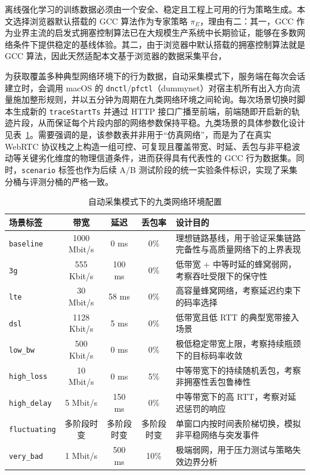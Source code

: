 离线强化学习的训练数据必须由一个安全、稳定且工程上可用的行为策略生成。本文选择浏览器默认搭载的 GCC 算法作为专家策略 $\pi_E$，理由有二：其一，GCC 作为业界主流的启发式拥塞控制算法已在大规模生产系统中长期验证，能够在多数网络条件下提供稳定的基线体验。其二，由于浏览器中默认搭载的拥塞控制算法就是 GCC 算法，因此天然适配本文基于浏览器的数据采集平台，

为获取覆盖多种典型网络环境下的行为数据，自动采集模式下，服务端在每次会话建立时，会调用 macOS 的 \texttt{dnctl}/\texttt{pfctl}（dummynet）对宿主机所有出入方向流量施加整形规则，并以五分钟为周期在九类网络环境之间轮询。每次场景切换时脚本生成新的 \texttt{traceStartTs} 并通过 HTTP 接口广播至前端，前端随即开启新的轨迹片段，从而保证每个片段内部的网络参数保持平稳。九类场景的具体参数化设计见表~\ref{tab:network-profiles-9}。需要强调的是，该参数表并非用于“仿真网络”，而是为了在真实 WebRTC 协议栈之上构造一组可控、可复现且覆盖带宽、时延、丢包与非平稳波动等关键劣化维度的物理信道条件，进而获得具有代表性的 GCC 行为数据集。同时，\texttt{scenario} 标签也作为后续 A/B 测试阶段的统一实验条件标识，实现了采集分桶与评测分桶的严格一致。

\begin{table}[htbp]
\centering
\small
\begin{tabular}{|l|c|c|c|p{5.8cm}|}
\hline
场景标签 & 带宽 & 延迟 & 丢包率 & 设计目的 \\
\hline
\texttt{baseline} & 1000 Mbit/s & 0 ms & 0\% & 理想链路基线，用于验证采集链路完备性与高质量网络下的上界表现 \\
\hline
\texttt{3g} & 555 Kbit/s & 100 ms & 0\% & 低带宽 + 中等时延的蜂窝弱网，考察吞吐受限下的保守性 \\
\hline
\texttt{lte} & 30 Mbit/s & 58 ms & 0\% & 高容量蜂窝网络，考察延迟约束下的码率选择 \\
\hline
\texttt{dsl} & 1128 Kbit/s & 5 ms & 0\% & 低带宽且低 RTT 的典型宽带接入场景 \\
\hline
\texttt{low\_bw} & 500 Kbit/s & 0 ms & 0\% & 极低稳定带宽上限，考察持续瓶颈下的目标码率收敛 \\
\hline
\texttt{high\_loss} & 10 Mbit/s & 0 ms & 5\% & 中等带宽下的持续随机丢包，考察非拥塞性丢包鲁棒性 \\
\hline
\texttt{high\_delay} & 5 Mbit/s & 150 ms & 0\% & 中等带宽下的高 RTT，考察对延迟惩罚的响应 \\
\hline
\texttt{fluctuating} & 多阶段时变 & 多阶段时变 & 多阶段时变 & 单窗口内按时间表阶梯切换，模拟非平稳网络与突发事件 \\
\hline
\texttt{very\_bad} & 1 Mbit/s & 500 ms & 10\% & 极端弱网，用于压力测试与策略失效边界分析 \\
\hline
\end{tabular}
\caption{自动采集模式下的九类网络环境配置}
\label{tab:network-profiles-9}
\end{table}

